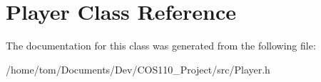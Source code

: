 \hypertarget{classPlayer}{\section{Player Class Reference}
\label{classPlayer}
}


The documentation for this class was generated from the following file\-:\begin{DoxyCompactItemize}
\item 
/home/tom/\-Documents/\-Dev/\-C\-O\-S110\-\_\-\-Project/src/Player.\-h\end{DoxyCompactItemize}
